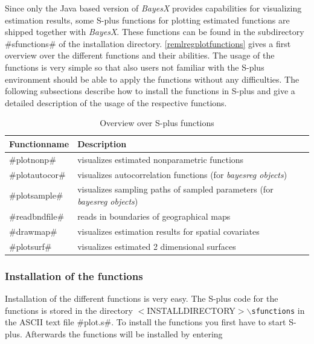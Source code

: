 Since only the Java based version of {\em BayesX} provides
capabilities for visualizing estimation results, some S-plus
functions for plotting estimated functions are shipped together
with {\em BayesX}. These functions can be found in the
subdirectory #sfunctions# of the installation directory.
\autoref{remlregplotfunctions} gives a first overview over the
different functions and their abilities. The usage of the
functions is very simple so that also users not familiar with the
S-plus environment should be able to apply the functions without
any difficulties. The following subsections describe how to
install the functions in S-plus and give a detailed description of
the usage of the respective functions.

\begin{table}[ht]
\begin{center}
\begin{tabular}{|l|l|}
\hline
{\bf Functionname} & {\bf Description} \\
\hline
#plotnonp# & visualizes estimated nonparametric functions \\
#plotautocor# & visualizes autocorrelation functions (for {\em bayesreg objects})\\
#plotsample# & visualizes sampling paths of sampled parameters (for {\em bayesreg objects})\\
#readbndfile# & reads in boundaries of geographical maps \\
#drawmap# & visualizes estimation results for spatial covariates \\
#plotsurf# & visualizes estimated 2 dimensional surfaces \\
\hline
\end{tabular}
\caption{\label{remlregplotfunctions} Overview over S-plus
functions}
\end{center}
\end{table}


\subsubsection{Installation of the functions}

Installation of the different functions is very easy. The S-plus
code for the functions is stored in the directory
$<$INSTALLDIRECTORY$>$\texttt{$\backslash$sfunctions} in the ASCII
text file #plot.s#. To install the functions you first have to
start S-plus. Afterwards the functions will be installed by
entering

